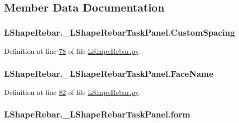 \subsection{Member Data Documentation}
\subsubsection[{\texorpdfstring{Custom\+Spacing}{CustomSpacing}}]{\setlength{\rightskip}{0pt plus 5cm}L\+Shape\+Rebar.\+\_\+\+L\+Shape\+Rebar\+Task\+Panel.\+Custom\+Spacing}\hypertarget{classLShapeRebar_1_1__LShapeRebarTaskPanel_abfd2b9b6897806fd5d69316ca7f2d687}{}\label{classLShapeRebar_1_1__LShapeRebarTaskPanel_abfd2b9b6897806fd5d69316ca7f2d687}


Definition at line \hyperlink{LShapeRebar_8py_source_l00078}{78} of file \hyperlink{LShapeRebar_8py_source}{L\+Shape\+Rebar.\+py}.

\subsubsection[{\texorpdfstring{Face\+Name}{FaceName}}]{\setlength{\rightskip}{0pt plus 5cm}L\+Shape\+Rebar.\+\_\+\+L\+Shape\+Rebar\+Task\+Panel.\+Face\+Name}\hypertarget{classLShapeRebar_1_1__LShapeRebarTaskPanel_a8f624818baf68844984b3368f27dc421}{}\label{classLShapeRebar_1_1__LShapeRebarTaskPanel_a8f624818baf68844984b3368f27dc421}


Definition at line \hyperlink{LShapeRebar_8py_source_l00082}{82} of file \hyperlink{LShapeRebar_8py_source}{L\+Shape\+Rebar.\+py}.

\subsubsection[{\texorpdfstring{form}{form}}]{\setlength{\rightskip}{0pt plus 5cm}L\+Shape\+Rebar.\+\_\+\+L\+Shape\+Rebar\+Task\+Panel.\+form}\hypertarget{classLShapeRebar_1_1__LShapeRebarTaskPanel_af6e6f9deafab993e53dabc404d832bef}{}\label{classLShapeRebar_1_1__LShapeRebarTaskPanel_af6e6f9deafab993e53dabc404d832bef}


